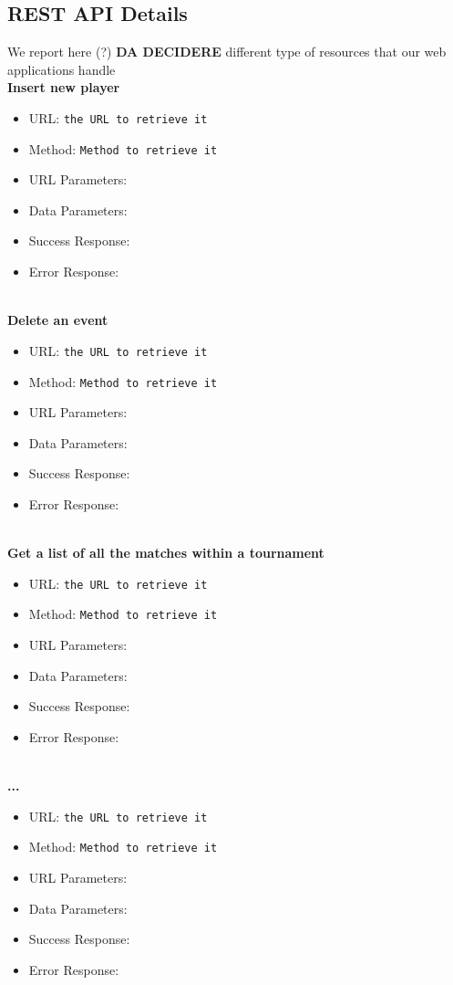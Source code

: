 \subsection{REST API Details}

We report here (?) \textbf{DA DECIDERE} different type of resources that our web applications handle\\
\textbf{Insert new player}
\begin{itemize}
    \item URL: \texttt{the URL to retrieve it}
    \item Method: \texttt{Method to retrieve it}
    \item URL Parameters:
    \item Data Parameters: 
    \item Success Response:
    \item Error Response:
\end{itemize}\\
\textbf{Delete an event}
\begin{itemize}
    \item URL: \texttt{the URL to retrieve it}
    \item Method: \texttt{Method to retrieve it}
    \item URL Parameters:
    \item Data Parameters: 
    \item Success Response:
    \item Error Response:
\end{itemize}\\
\textbf{Get a list of all the matches within a tournament}
\begin{itemize}
    \item URL: \texttt{the URL to retrieve it}
    \item Method: \texttt{Method to retrieve it}
    \item URL Parameters:
    \item Data Parameters: 
    \item Success Response:
    \item Error Response:
\end{itemize}\\
\textbf{...}
\begin{itemize}
    \item URL: \texttt{the URL to retrieve it}
    \item Method: \texttt{Method to retrieve it}
    \item URL Parameters:
    \item Data Parameters: 
    \item Success Response:
    \item Error Response:
\end{itemize}
